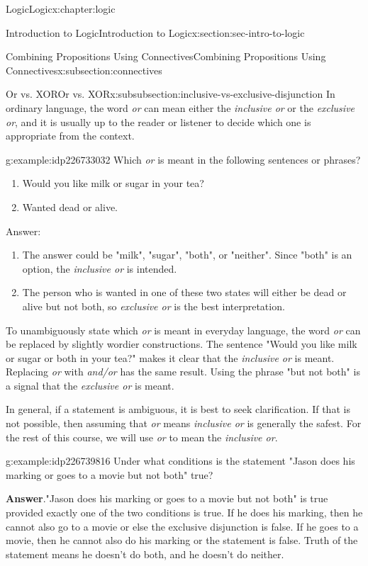 \documentclass[twoside,10pt,]{book}
\newcommand{\blocktitlefont}{\relax}
\numberwithin{equation}{section}
\begin{document}
\begin{chapterptx}{Logic}{}{Logic}{}{}{x:chapter:logic}
\begin{sectionptx}{Introduction to Logic}{}{Introduction to Logic}{}{}{x:section:sec-intro-to-logic}
\begin{subsectionptx}{Combining Propositions Using Connectives}{}{Combining Propositions Using Connectives}{}{}{x:subsection:connectives}
%
\begin{subsubsectionptx}{Or vs. XOR}{}{Or vs. XOR}{}{}{x:subsubsection:inclusive-vs-exclusive-disjunction}
In ordinary language, the word \emph{or} can mean either the \emph{inclusive or} or the \emph{exclusive or},  and it is usually up to the reader or listener to decide which one is appropriate from the context.%
\begin{example}{}{g:example:idp226733032}%
Which \emph{or} is meant in the following sentences or phrases?%
\begin{enumerate}
\item{}Would you like milk or sugar in your tea?%
\item{}Wanted dead or alive.%
\end{enumerate}
%
\par
Answer:%
\begin{enumerate}
\item{}The answer could be "milk", "sugar", "both", or "neither".  Since "both" is an option, the \emph{inclusive or} is intended.%
\item{}The person who is wanted in one of these two states will either be dead or alive but not both, so \emph{exclusive or} is the best interpretation.%
\end{enumerate}
%
\end{example}
To unambiguously state which \emph{or} is meant in everyday language, the word \emph{or} can be replaced by slightly wordier constructions.  The sentence "Would you like milk or sugar or both in your tea?" makes it clear that the \emph{inclusive or} is meant.  Replacing \emph{or} with \emph{and\slash{}or} has the same result.  Using the phrase "but not both" is a signal that the \emph{exclusive or} is meant.%
\par
In general, if a statement is ambiguous, it is best to seek clarification.  If that is not possible, then assuming that \emph{or} means \emph{inclusive or} is generally the safest.  For the rest of this course, we will use \emph{or} to mean the \emph{inclusive or}.%
\begin{example}{}{g:example:idp226739816}%
Under what conditions is the statement "Jason does his marking or goes to a movie but not both" true?\par\smallskip%
\noindent\textbf{\blocktitlefont Answer}.\label{g:answer:idp226740712}{}\hypertarget{g:answer:idp226740712}{}\quad{}"Jason does his marking or goes to a movie but not both" is true provided exactly one of the two conditions is true.  If he does his marking, then he cannot also go to a movie or else the exclusive disjunction is false.  If he goes to a movie, then he cannot also do his marking or the statement is false.  Truth of the statement means he doesn't do both, and he doesn't do neither.\end{example}

\end{subsubsectionptx}
\end{subsectionptx}
\end{sectionptx}
\end{chapterptx}
\end{document}
